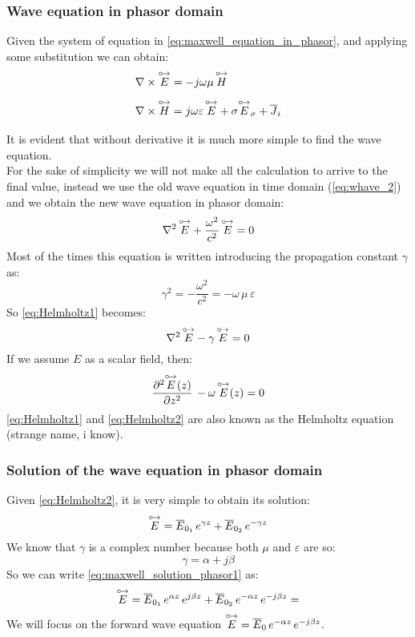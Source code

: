 \subsubsection*{Wave equation in phasor domain}
Given the system of equation in \cref{eq:maxwell_equation_in_phasor}, and applying some substitution we can obtain:
\begin{align}\label{eq:maxwell_equation_in_phasor_2}
    \begin{split}
        &\nabla\times\overset{\mathbin {{\circ \mkern-2.5mu\rightarrow}}}{E}=-j\omega\mu\,\overset{\mathbin {{\circ \mkern-2.5mu\rightarrow}}}{H}\\[5pt]
        &\nabla\times\overset{\mathbin {{\circ \mkern-2.5mu\rightarrow}}}{H}=j\omega \varepsilon\,\overset{\mathbin {{\circ \mkern-2.5mu\rightarrow}}}{E}+\sigma\overset{\mathbin {{\circ \mkern-2.5mu\rightarrow}}}{E}_\sigma+\overline{J}_i\\[5pt]
    \end{split}
\end{align}
It is evident that without derivative it is much more simple to find the wave equation.\\
For the sake of simplicity we will not make all the calculation to arrive to the final value, instead we use the old wave equation in time domain (\cref{eq:whave_2}) and we obtain the new wave equation in phasor domain:
\begin{equation}\label{eq:Helmholtz1}
    \nabla^2\,\overset{\mathbin {{\circ \mkern-2.5mu\rightarrow}}}{E}+\frac{\omega^2}{c^2}\,\overset{\mathbin {{\circ \mkern-2.5mu\rightarrow}}}{E}=0
\end{equation}
Most of the times this equation is written introducing the propagation constant $\gamma$ as:
\begin{equation}\label{eq:gamma_1}
    \gamma^2=-\frac{\omega^2}{c^2}=-\omega\,\mu\,\varepsilon
\end{equation}
So \cref{eq:Helmholtz1} becomes:
\begin{equation}
    \nabla^2\,\overset{\mathbin {{\circ \mkern-2.5mu\rightarrow}}}{E}-\gamma\,\overset{\mathbin {{\circ \mkern-2.5mu\rightarrow}}}{E}=0
\end{equation}
If we assume $E$ as a scalar field, then:
\begin{equation}\label{eq:Helmholtz2}
    \frac{\partial^2\overset{\mathbin {{\circ \mkern-2.5mu\rightarrow}}}{E}(z)}{\partial z^2}\,-\omega\,\overset{\mathbin {{\circ \mkern-2.5mu\rightarrow}}}{E}(z)=0
\end{equation}
\cref{eq:Helmholtz1} and \cref{eq:Helmholtz2} are also known as the Helmholtz equation (strange name, i know).
\subsubsection*{Solution of the wave equation in phasor domain}
Given \cref{eq:Helmholtz2}, it is very simple to obtain its solution:
\begin{equation}\label{eq:maxwell_solution_phasor1}
    \overset{\mathbin {{\circ \mkern-2.5mu\rightarrow}}}{E}=\overline{E}_{0_1}\,e^{\gamma z}+\overline{E}_{0_2}\,e^{-\gamma z}
\end{equation}
We know that $\gamma$ is a complex number because both $\mu$ and $\varepsilon$ are so:
\begin{equation}
    \gamma=\alpha+j\beta
\end{equation}
So we can write \cref{eq:maxwell_solution_phasor1} as:
\begin{equation}\label{eq:maxwell_solution_phasor}
    \overset{\mathbin {{\circ \mkern-2.5mu\rightarrow}}}{E}=\overline{E}_{0_1}\,e^{\alpha z}\,e^{j\beta z}+\overline{E}_{0_2}\,e^{-\alpha z}\,e^{-j\beta z}=
\end{equation}
We will focus on the forward wave equation $\overset{\mathbin {{\circ \mkern-2.5mu\rightarrow}}}{E}=\overline{E}_{0}\,e^{-\alpha z}\,e^{-j\beta z}$.
